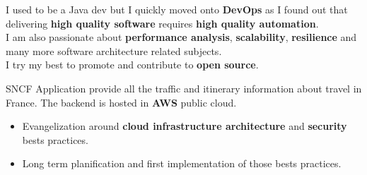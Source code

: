 \documentclass[10pt,a4paper,ragged2e]{altacv}
\begin{document}

\begin{fullwidth}
\makecvheader
\end{fullwidth}


	\quad I used to be a Java dev but I quickly moved onto \textbf{DevOps} as I found out that delivering \textbf{high quality software} requires \textbf{high quality automation}.
	\\
	\medskip
	\quad I am also passionate about \textbf{performance analysis}, \textbf{scalability}, \textbf{resilience} and many more software architecture related subjects.
	\\
	\medskip
	\quad I try my best to promote and contribute to \textbf{open source}.
	

\bigskip
{}
		
		SNCF Application provide all the traffic and itinerary information about travel in France. The backend is hosted in \textbf{AWS} public cloud.
		
		\medskip
		\begin{itemize}	
			\item Evangelization around \textbf{cloud infrastructure architecture} and \textbf{security} bests practices.
			\item Long term planification and first implementation of those bests practices.
		\end{itemize}
	\divider
\end{document}
